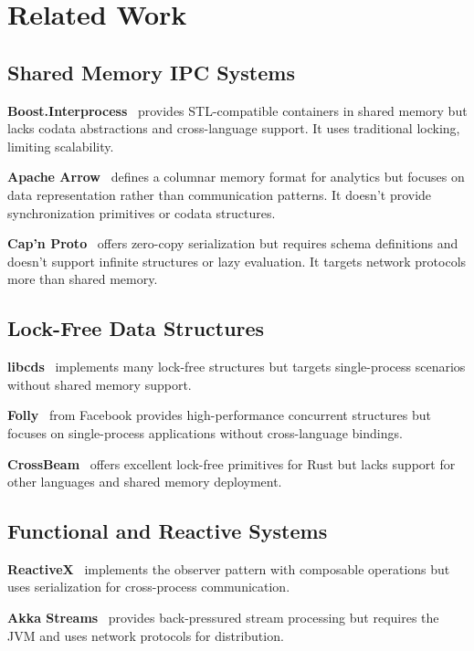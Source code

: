 \documentclass[11pt]{article}
\begin{document}
\section{Related Work}

\subsection{Shared Memory IPC Systems}

\textbf{Boost.Interprocess}~\cite{boost_interprocess} provides STL-compatible containers in shared memory but lacks codata abstractions and cross-language support. It uses traditional locking, limiting scalability.

\textbf{Apache Arrow}~\cite{arrow} defines a columnar memory format for analytics but focuses on data representation rather than communication patterns. It doesn't provide synchronization primitives or codata structures.

\textbf{Cap'n Proto}~\cite{capnproto} offers zero-copy serialization but requires schema definitions and doesn't support infinite structures or lazy evaluation. It targets network protocols more than shared memory.

\subsection{Lock-Free Data Structures}

\textbf{libcds}~\cite{libcds} implements many lock-free structures but targets single-process scenarios without shared memory support.

\textbf{Folly}~\cite{folly} from Facebook provides high-performance concurrent structures but focuses on single-process applications without cross-language bindings.

\textbf{CrossBeam}~\cite{crossbeam} offers excellent lock-free primitives for Rust but lacks support for other languages and shared memory deployment.

\subsection{Functional and Reactive Systems}

\textbf{ReactiveX}~\cite{reactivex} implements the observer pattern with composable operations but uses serialization for cross-process communication.

\textbf{Akka Streams}~\cite{akka} provides back-pressured stream processing but requires the JVM and uses network protocols for distribution.
\end{document}
